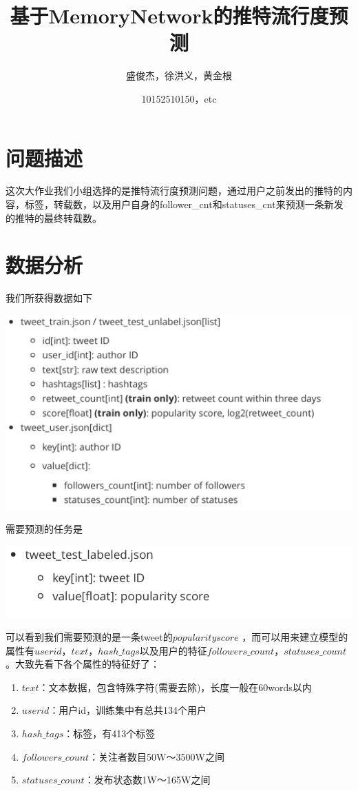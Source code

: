 \documentclass[a4paper, 12pt]{ctexart}
\begin{document}
\title{基于MemoryNetwork的推特流行度预测}
\author{盛俊杰，徐洪义，黄金根}
\date{10152510150，etc}
\maketitle


\section{问题描述}
这次大作业我们小组选择的是推特流行度预测问题，通过用户之前发出的推特的内容，标签，转载数，以及用户自身的follower\_cnt和statuses\_cnt来预测一条新发的推特的最终转载数。
\section{数据分析}
我们所获得数据如下

\includegraphics[width=6inc]{tweet_pics/data}

需要预测的任务是

\includegraphics[width=6inc]{tweet_pics/task}

可以看到我们需要预测的是一条tweet的$ popularity score$ ，而可以用来建立模型的属性有$userid$，$text$，$hash\_tags$以及用户的特征$followers\_count$，$statuses\_count$。大致先看下各个属性的特征好了：
\begin{enumerate}
	\item $text$：文本数据，包含特殊字符(需要去除)，长度一般在60words以内
	\item $userid$：用户id，训练集中有总共134个用户
	\item $hash\_tags$：标签，有413个标签
	\item $followers\_count$：关注者数目50W～3500W之间
	\item $statuses\_count$：发布状态数1W～165W之间
\end{enumerate}
\end{document}
